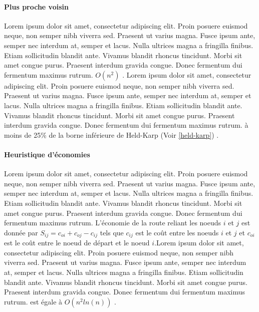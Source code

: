 \paragraph{Plus proche voisin}
\label{par:nn}
Lorem ipsum dolor sit amet, consectetur adipiscing elit. Proin posuere euismod neque, non semper nibh viverra sed. Praesent ut varius magna. Fusce ipsum ante, semper nec interdum at, semper et lacus. Nulla ultrices magna a fringilla finibus. Etiam sollicitudin blandit ante. Vivamus blandit rhoncus tincidunt. Morbi sit amet congue purus. Praesent interdum gravida congue. Donec fermentum dui fermentum maximus rutrum. $O(n^2)$ \parencite{rosenkrantz_analysis_1977}.
Lorem ipsum dolor sit amet, consectetur adipiscing elit. Proin posuere euismod neque, non semper nibh viverra sed. Praesent ut varius magna. Fusce ipsum ante, semper nec interdum at, semper et lacus. Nulla ultrices magna a fringilla finibus. Etiam sollicitudin blandit ante. Vivamus blandit rhoncus tincidunt. Morbi sit amet congue purus. Praesent interdum gravida congue. Donec fermentum dui fermentum maximus rutrum. à moins de 25\% de la borne inférieure de Held-Karp (Voir \ref{held-karp}) \parencite{johnson_table_1995}.


\medskip


\paragraph{Heuristique d'économies}
Lorem ipsum dolor sit amet, consectetur adipiscing elit. Proin posuere euismod neque, non semper nibh viverra sed. Praesent ut varius magna. Fusce ipsum ante, semper nec interdum at, semper et lacus. Nulla ultrices magna a fringilla finibus. Etiam sollicitudin blandit ante. Vivamus blandit rhoncus tincidunt. Morbi sit amet congue purus. Praesent interdum gravida congue. Donec fermentum dui fermentum maximus rutrum. L'économie de la route reliant les noeuds $i$ et $j$ est donnée par $S_{ij} = c_{oi} + c_{oj} - c_{ij}$ tels que $c_{ij}$ est le coût entre les noeuds $i$ et $j$ et $c_{oi}$ est le coût entre le noeud de départ et le noeud $i$.Lorem ipsum dolor sit amet, consectetur adipiscing elit. Proin posuere euismod neque, non semper nibh viverra sed. Praesent ut varius magna. Fusce ipsum ante, semper nec interdum at, semper et lacus. Nulla ultrices magna a fringilla finibus. Etiam sollicitudin blandit ante. Vivamus blandit rhoncus tincidunt. Morbi sit amet congue purus. Praesent interdum gravida congue. Donec fermentum dui fermentum maximus rutrum. est égale à $O(n^2ln(n))$ \parencite{golden_approximate_1980}. 

